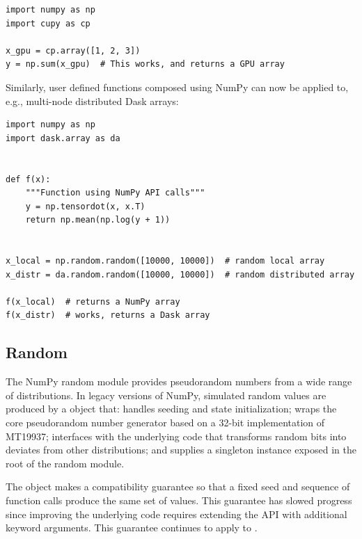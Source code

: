 \begin{lstlisting}
import numpy as np
import cupy as cp

x_gpu = cp.array([1, 2, 3])
y = np.sum(x_gpu)  # This works, and returns a GPU array
\end{lstlisting}


Similarly, user defined functions composed using NumPy can now be
applied to, e.g., multi-node distributed Dask arrays:

\begin{lstlisting}
import numpy as np
import dask.array as da


def f(x):
    """Function using NumPy API calls"""
    y = np.tensordot(x, x.T)
    return np.mean(np.log(y + 1))


x_local = np.random.random([10000, 10000])  # random local array
x_distr = da.random.random([10000, 10000])  # random distributed array

f(x_local)  # returns a NumPy array
f(x_distr)  # works, returns a Dask array
\end{lstlisting}

\subsection{Random}


The NumPy random module provides pseudorandom numbers from a wide range of
distributions. In legacy versions of NumPy, simulated random values are produced
by a  object that: handles seeding and state initialization;
wraps the core pseudorandom number generator based on a 32-bit implementation of
MT19937; interfaces with the underlying code that transforms random bits into
deviates from other distributions; and supplies a singleton instance exposed in
the root of the random module.

The  object makes a compatibility guarantee so that a fixed
seed and sequence of function calls produce the same set of values. This
guarantee has slowed progress since improving the underlying code requires
extending the API with additional keyword arguments. This guarantee continues to
apply to . 

